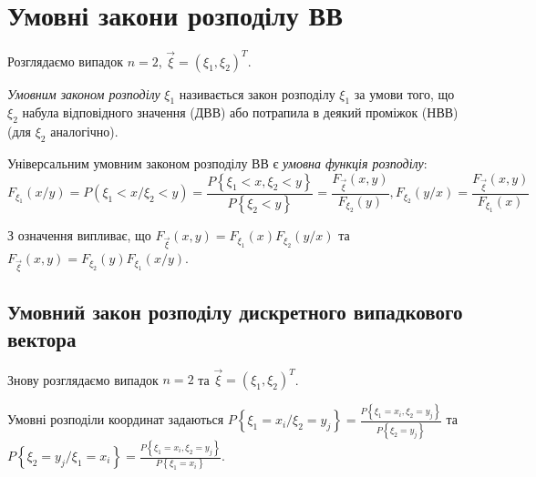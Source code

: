 
\section{Умовні закони розподілу ВВ}

Розглядаємо випадок $n = 2$, $\vec{\xi} = \left(\xi_1, \xi_2\right)^T$.

\begin{definition}
    \emph{Умовним законом розподілу} $\xi_1$ називається закон розподілу 
    $\xi_1$ за умови того, що $\xi_2$ набула відповідного значення (ДВВ) 
    або потрапила в деякий проміжок (НВВ) (для $\xi_2$ аналогічно).
\end{definition}

\begin{definition}
    Універсальним умовним законом розподілу ВВ є \emph{умовна функція 
    розподілу}:
    \begin{equation*}
        F_{\xi_1}(x/y) = P({\xi_1 < x}/{\xi_2 < y}) = 
        \frac{P\left\{\xi_1 < x, \xi_2 < y\right\}}
        {P\left\{\xi_2 < y\right\}} = 
        \frac{F_{\vec{\xi}}(x, y)}{F_{\xi_2}(y)}, F_{\xi_2}(y/x) = \frac{F_{\vec{\xi}}(x, y)}{F_{\xi_1}(x)}
    \end{equation*}
\end{definition}
\begin{remark}
    З означення випливає, що 
    $F_{\vec{\xi}}(x,y) = F_{\xi_1}(x)F_{\xi_2}(y/x)$
    та 
    $F_{\vec{\xi}}(x,y) = F_{\xi_2}(y)F_{\xi_1}(x/y)$.
\end{remark}
\subsection{Умовний закон розподілу дискретного випадкового вектора}
Знову розглядаємо випадок $n=2$ та $\vec{\xi} = (\xi_1, \xi_2)^T$.

Умовні розподіли координат задаються $P\left\{\xi_1 = x_i / \xi_2 = y_j\right\} = 
\frac{P\left\{\xi_1 = x_i , \xi_2 = y_j\right\}}
{P\left\{\xi_2 = y_j\right\}}$ та \\ 
$P\left\{\xi_2 = y_j / \xi_1 = x_i\right\} = 
\frac{P\left\{\xi_1 = x_i , \xi_2 = y_j\right\}}
{P\left\{\xi_1 = x_i\right\}}$.

